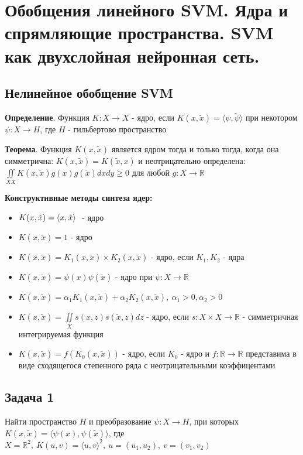 \section{Обобщения линейного SVM. Ядра и спрямляющие пространства. SVM как двухслойная нейронная сеть.}
\subsection*{Нелинейное обобщение SVM}
\textbf{Определение}. Функция $K: X \rightarrow X$ - ядро, если $K(x, \tilde{x}) = \langle \psi, \tilde{\psi} \rangle $ при некотором $\psi: X \rightarrow H$, где $H$ - гильбертово пространство

\noindent\textbf{Теорема}. Функция $K(x, \tilde{x})$ является ядром тогда и только тогда, когда
она симметрична: $K(x, \tilde{x}) = K(\tilde{x}, x)$ и неотрицательно определена:
$ \iint\limits_{XX} K(x, \tilde{x})g(x)g(\tilde{x}) dxdy \ge 0$ для любой $g: X \rightarrow \mathbb{R}$

\noindent\textbf{Конструктивные методы синтеза ядер:}
\begin{itemize}
  \item $K(x, \tilde{x}) = \text{\textlangle} x, \tilde{x} \text{\textrangle} ~$ - ядро
  \item $K(x, \tilde{x}) = 1$ - ядро
  \item $K(x, \tilde{x}) = K_1(x, \tilde{x}) \times K_2(x, \tilde{x})$ - ядро, если $K_1, K_2$ - ядра
  \item $K(x, \tilde{x}) = \psi(x)\psi(\tilde{x})$ - ядро при $\psi: X \rightarrow \mathbb{R}$
  \item $K(x, \tilde{x}) = \alpha_1 K_1(x, \tilde{x}) + \alpha_2 K_2(x, \tilde{x}), ~ \alpha_1 > 0, \alpha_2 > 0$
  \item $K(x ,\tilde{x}) = \iint\limits_{X} s(x, z) s(\tilde{x}, z) dz$ - ядро, если $s: X \times X \rightarrow \mathbb{R}$ - симметричная интегрируемая функция
  \item $K(x, \tilde{x}) = f(K_0(x, \tilde{x}))$ - ядро, если $K_0$ - ядро и $f: \mathbb{R} \rightarrow \mathbb{R}$ представима в виде сходящегося степенного ряда с неотрицательными коэффицентами 
\end{itemize}

\subsection{Задача 1}
Найти пространство $H$ и преобразование $\psi: X \rightarrow H$, при которых 
$K(x, \tilde{x}) = \langle \psi(x),\psi(\tilde{x}) \rangle $, где $X = \mathbb{R}^2,~
K(u, v) = \langle u, v \rangle^2,~ u = (u_1, u_2),~ v = (v_1, v_2)$
